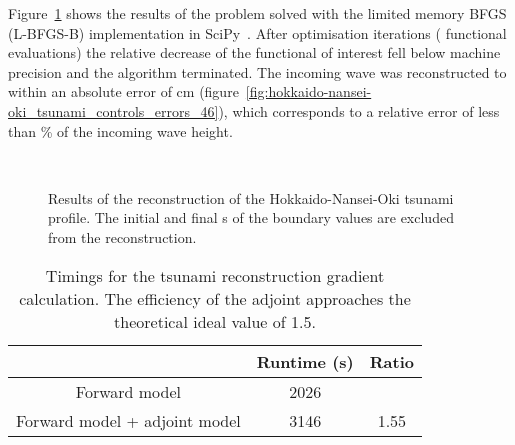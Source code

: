\documentclass[prodmode,acmtoms]{acmsmall}
\begin{document}
Figure~\ref{fig:hokkaido-nansei-oki_tsunami-results} shows the results of the problem solved with the limited memory BFGS (L-BFGS-B) implementation in SciPy~\cite{scipy}.
After  optimisation iterations ( functional evaluations) the relative decrease of the functional of interest fell below machine precision and the algorithm terminated. 
The incoming wave was reconstructed to within an absolute error of  cm (figure~\ref{fig:hokkaido-nansei-oki_tsunami_controls_errors_46}),
which corresponds to a relative error of less than \% of the incoming wave height.

\begin{figure}[t]
\centering
{}
      \\
        \caption{Results of the reconstruction of the Hokkaido-Nansei-Oki tsunami profile.
        The initial and final  s of the boundary values are excluded from the reconstruction.}
\label{fig:hokkaido-nansei-oki_tsunami-results}
\end{figure}
\begin{table}
\centering
\begin{tabular}{ccc}
\toprule
       & Runtime (s) & Ratio \\
\midrule
Forward model & 2026 &     \\
Forward model + adjoint model & 3146 & 1.55 \\
\bottomrule
\end{tabular}
\caption{Timings for the tsunami reconstruction gradient calculation. 
The efficiency of the adjoint approaches the theoretical ideal value of 1.5.}
\label{tab:tsunami-timings}
\end{table}
\end{document}
